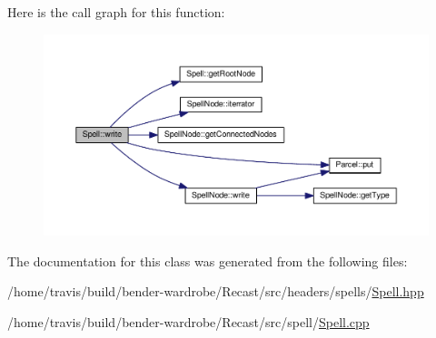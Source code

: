 Here is the call graph for this function\-:
\nopagebreak
\begin{figure}[H]
\begin{center}
\leavevmode
\includegraphics[width=350pt]{class_spell_a6b2d7baf1e88b6e8075567f8c4afb716_cgraph}
\end{center}
\end{figure}




The documentation for this class was generated from the following files\-:\begin{DoxyCompactItemize}
\item 
/home/travis/build/bender-\/wardrobe/\-Recast/src/headers/spells/\hyperlink{_spell_8hpp}{Spell.\-hpp}\item 
/home/travis/build/bender-\/wardrobe/\-Recast/src/spell/\hyperlink{_spell_8cpp}{Spell.\-cpp}\end{DoxyCompactItemize}
